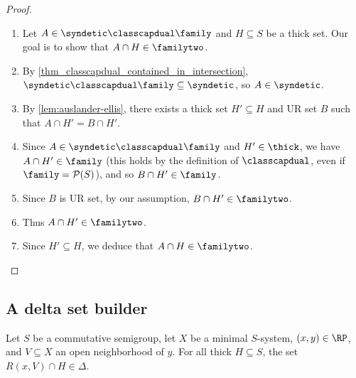 
\begin{proof}
\leanok{}
\begin{enumerate}
    \item Let $A \in \syndetic \classcapdual \family$ and $H \subseteq S$ be a thick set. Our goal is to show that $A \cap H \in \familytwo$.

    \item By \cref{thm_classcapdual_contained_in_intersection}, $\syndetic \classcapdual \family \subseteq \syndetic$, so $A \in \syndetic$.

    \item By \cref{lem:auslander-ellis}, there exists a thick set $H' \subseteq H$ and UR set $B$ such that $A \cap H' = B \cap H'$.

    \item Since $A \in \syndetic \classcapdual \family$ and $H' \in \thick$, we have $A \cap H' \in \family$ (this holds by the definition of $\classcapdual$, even if $\family = \mathcal{P}(S)$), and so $B \cap H' \in \family$. 

    \item Since $B$ is UR set, by our assumption, $B \cap H' \in \familytwo$.

    \item Thus $A \cap H' \in \familytwo$.

    \item Since $H' \subseteq H$, we deduce that $A \cap H \in \familytwo$.
    \end{enumerate}
\end{proof}

\subsection{A delta set builder}

\begin{theorem}
\label{thm_delta_from_kronecker}
\leanok{}
    Let $S$ be a commutative semigroup, let $X$ be a minimal $S$-system, $(x, y) \in \RP$, and $V \subseteq X$ an open neighborhood of $y$.  For all thick $H \subseteq S$, the set $R(x,V) \cap H \in \Delta$.
\end{theorem}

